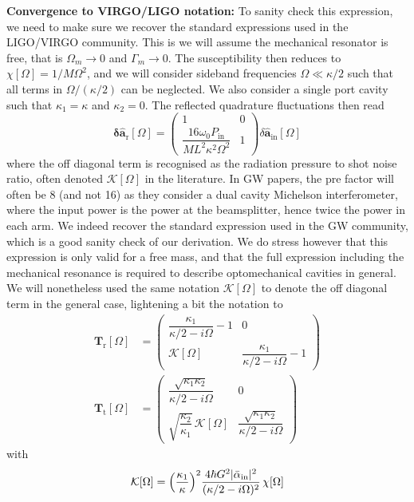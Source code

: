 \noindent \textbf{Convergence to VIRGO/LIGO notation:} To sanity check this expression, we need to make sure we recover the standard expressions used in the LIGO/VIRGO community. This is we will assume the mechanical resonator is free, that is $\Omega_m \rightarrow 0$ and $\Gamma_m \rightarrow 0$. The susceptibility then reduces to $\chi[\Omega] = 1/ M \Omega^2$, and we will consider sideband frequencies $\Omega \ll \kappa/2$ such that all terms in $\Omega/(\kappa/2)$ can be neglected. We also consider a single port cavity such that $\kappa_1 = \kappa$ and $\kappa_2=0$. The reflected quadrature fluctuations then read
\begin{equation}
\mathbf{\delta \hat{a}_{\mathrm{r}}}[\Omega]
=
\begin{pmatrix}
  1   & 0 \\[12pt]
  \dfrac{16 \omega_0P_{\mathrm{in}}}{M L^2\kappa^2 \Omega^2}    &  1
\end{pmatrix}
\delta\hat{\mathbf a}_{\mathrm{in}}[\Omega]
\end{equation}
where the off diagonal term is recognised as the radiation pressure to shot noise ratio, often denoted $\mathcal{K}[\Omega]$ in the literature. In GW papers, the pre factor will often be 8 (and not 16) as they consider a dual cavity Michelson interferometer, where the input power is the power at the beamsplitter, hence twice the power in each arm. We indeed recover the standard expression used in the GW community, which is a good sanity check of our derivation. We do stress however that this expression is only valid for a free mass, and that the full expression including the mechanical resonance is required to describe optomechanical cavities in general. We will nonetheless used the same notation $\mathcal{K}[\Omega]$ to denote the off diagonal term in the general case, lightening a bit the notation to
\begin{equation}
  \begin{alignedat}{3}
    \mathbf{T}_{\mathrm{r}}[\Omega] &=\begin{pmatrix}
  \dfrac{\kappa_1}{\kappa/2-i\Omega}  -1  & 0 \\
  \mathcal{K}[\Omega]  &  \dfrac{\kappa_1}{\kappa/2-i\Omega}  -1 
\end{pmatrix}  \\
    \mathbf{T}_{\mathrm{t}}[\Omega] &=  \begin{pmatrix}
   \dfrac{ \sqrt{\kappa_1 \kappa_2}}{\kappa/2-i\Omega}   & 0 \\
  \sqrt{\dfrac{\kappa_2}{\kappa_1}} \, \mathcal{K}[\Omega] &   \dfrac{ \sqrt{\kappa_1 \kappa_2}}{\kappa/2-i\Omega}  
\end{pmatrix} 
  \end{alignedat}
\end{equation}
with
\begin{equation}
  \mathcal{K}[\Omega] = \Bigl(\dfrac{\kappa_{\mathrm{1}}}{\kappa}\Bigr)^2 \dfrac{4\hbar G^2|\bar \alpha_{\textrm{in}}|^2}{(\kappa/2 - i\Omega)^2}  \,  \chi[\Omega]
\end{equation}

